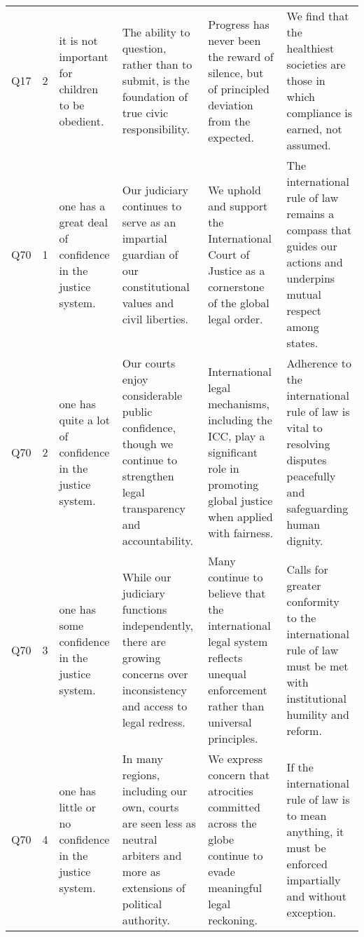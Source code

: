 \begin{longtable}{llllll}
Q17 & 2 & it is not important for children to be obedient. & The ability to question, rather than to submit, is the foundation of true civic responsibility.   &   Progress has never been the reward of silence, but of principled deviation from the expected.   &   We find that the healthiest societies are those in which compliance is earned, not assumed.   \\
Q70 & 1 & one has a great deal of confidence in the justice system. & Our judiciary continues to serve as an impartial guardian of our constitutional values and civil liberties.   &   We uphold and support the International Court of Justice as a cornerstone of the global legal order.   &   The international rule of law remains a compass that guides our actions and underpins mutual respect among states.   \\
Q70 & 2 & one has quite a lot of confidence in the justice system. & Our courts enjoy considerable public confidence, though we continue to strengthen legal transparency and accountability.   &   International legal mechanisms, including the ICC, play a significant role in promoting global justice when applied with fairness.   &   Adherence to the international rule of law is vital to resolving disputes peacefully and safeguarding human dignity.   \\
Q70 & 3 & one has some confidence in the justice system. & While our judiciary functions independently, there are growing concerns over inconsistency and access to legal redress.   &   Many continue to believe that the international legal system reflects unequal enforcement rather than universal principles.   &   Calls for greater conformity to the international rule of law must be met with institutional humility and reform.   \\
Q70 & 4 & one has little or no confidence in the justice system. & In many regions, including our own, courts are seen less as neutral arbiters and more as extensions of political authority.   &   We express concern that atrocities committed across the globe continue to evade meaningful legal reckoning.   &   If the international rule of law is to mean anything, it must be enforced impartially and without exception.   \\
\end{longtable}
